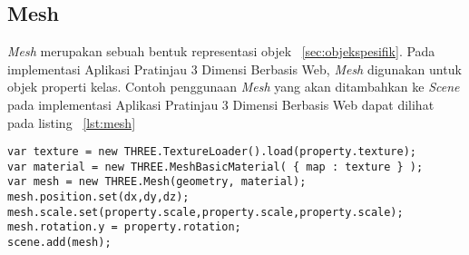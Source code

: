 \subsection{Mesh}
{\it Mesh} merupakan sebuah bentuk representasi objek ~\ref{sec:objekspesifik}. Pada implementasi Aplikasi Pratinjau 3 Dimensi Berbasis Web, {\it Mesh} digunakan untuk objek properti kelas. Contoh penggunaan {\it Mesh} yang akan ditambahkan ke {\it Scene} pada implementasi Aplikasi Pratinjau 3 Dimensi Berbasis Web dapat dilihat pada listing ~\ref{lst:mesh}
\begin{lstlisting}[caption={Contoh penggunaan {\it Mesh}}, label={lst:mesh},captionpos=b]
var texture = new THREE.TextureLoader().load(property.texture);
var material = new THREE.MeshBasicMaterial( { map : texture } ); 
var mesh = new THREE.Mesh(geometry, material);
mesh.position.set(dx,dy,dz);
mesh.scale.set(property.scale,property.scale,property.scale);
mesh.rotation.y = property.rotation;
scene.add(mesh);
\end{lstlisting}

